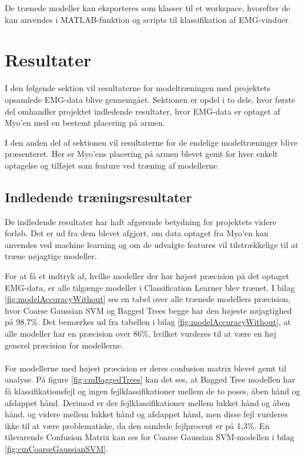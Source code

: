 De trænede modeller kan eksporteres som klasser til et workspace, hvorefter de kan anvendes i MATLAB-funktion og scripts til klassifikation af EMG-vinduer.

\section{Resultater}	
I den følgende sektion vil resultaterne for modeltræningen med projektets opsamlede EMG-data blive gennemgået. Sektionen er opdel i to dele, hvor første del omhandler projektet indledende resultater, hvor EMG-data er optaget af Myo'en med en bestemt placering på armen.

I den anden del af sektionen vil resultaterne for de endelige modeltræninger blive præsenteret. Her er Myo'ens placering på armen blevet gemt for hver enkelt optagelse og tilføjet som feature ved træning af modellerne.

 \subsection{Indledende træningsresultater}
 De indledende resultater har haft afgørende betydning for projektets videre forløb. Det er ud fra dem blevet afgjort, om data optaget fra Myo'en kan anvendes ved machine learning og om de udvalgte features vil tilstrækkelige til at træne nøjagtige modeller. 
 
For at få et indtryk af, hvilke modeller der har højest præcision på det optaget EMG-data, er alle tilgænge modeller i Classification Learner blev trænet. I bilag \ref{fig:modelAccuracyWithout} ses en tabel over alle trænede modellers præcision, hvor Coarse Gaussian SVM og Bagged Trees begge har den højeste nøjagtighed på 98,7\%.
Det bemærkes ud fra tabellen i bilag \ref{fig:modelAccuracyWithout}, at alle modeller har en præcision over 86\%, hvilket vurderes til at være en høj generel præcision for modellerne. 
\\\\
For modellerne med højest præcision er deres confusion matrix blevet gemt til analyse. På figure \ref{fig:cmBaggedTrees} kan det ses, at Bagged Tree modellen har få klassifikationsfejl og ingen fejlklassifikationer mellem de to poses, åben hånd og afslappet hånd. Derimod er der fejlklassifikationer mellem lukket hånd og åben hånd, og videre mellem lukket hånd og afslappet hånd, men disse fejl vurderes ikke til at være problematiske, da den samlede fejlprocent er på 1,3\%. En tilsvarende Confusion Matrix kan ses for Coarse Gaussian SVM-modellen i bilag \ref{fig:cmCoarseGaussianSVM}. 
 
